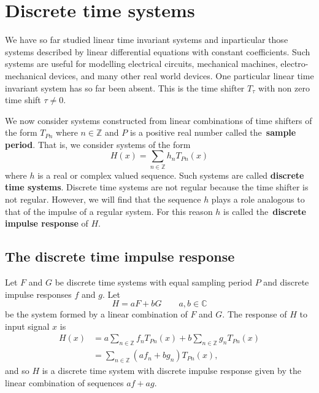 \documentclass[11pt,a4paper]{book}
\theoremstyle{plain}
\numberwithin{equation}{section}
\newcommand{\ints}{{\mathbb Z}}
\newcommand{\complex}{{\mathbb C}}
\newcommand{\term}{\textbf}
\begin{document}


\chapter{Discrete time systems} \label{cha:discr-time-syst}

We have so far studied linear time invariant systems and inparticular those systems described by linear differential equations with constant coefficients.  Such systems are useful for modelling electrical circuits, mechanical machines, electro-mechanical devices, and many other real world devices.  One particular linear time invariant system has so far been absent. This is the time shifter $T_\tau$ with non zero time shift $\tau \neq 0$.  %

We now consider systems constructed from linear combinations of time shifters of the form $T_{Pn}$ where $n \in \ints$ and $P$ is a positive real number called the~\term{sample period}.  That is, we consider systems of the form
\[
H(x) = \sum_{n \in \ints} h_n T_{ P n}(x)
\]
where $h$ is a real or complex valued sequence.  Such systems are called \term{discrete time systems}.  Discrete time systems are not regular because the time shifter is not regular.  However, we will find that the sequence $h$ plays a role analogous to that of the impulse of a regular system.  For this reason $h$  is called the~\term{discrete impulse response} of $H$.


\section{The discrete time impulse response} \label{sec:discr-time-impulse}

Let $F$ and $G$ be discrete time systems with equal sampling period $P$ and discrete impulse responses $f$ and $g$.  Let 
\[
H = a F + b G \qquad a,b\in\complex
\]
be the system formed by a linear combination of $F$ and $G$.  The response of $H$ to input signal $x$ is
\begin{align*}
H(x) &= a \sum_{n \in \ints} f_{n} T_{ P n}(x) + b \sum_{n \in \ints} g_{n} T_{ P n}(x) \\
&=  \sum_{n \in \ints} (a f_{n} + b g_{n}) T_{ P n}(x),
\end{align*}
and so $H$ is a discrete time system with discrete impulse response given by the linear combination of sequences $af + ag$.
\end{document}

